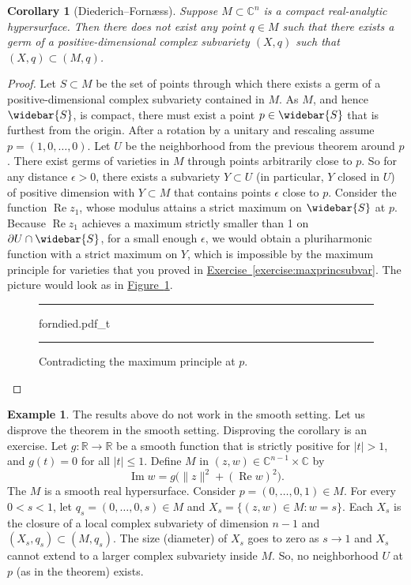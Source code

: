\documentclass[12pt,openany]{book}
\renewcommand{\Re}{\operatorname{Re}}
\renewcommand{\Im}{\operatorname{Im}}
\newcommand{\sabs}[1]{\lvert {#1} \rvert}
\newcommand{\snorm}[1]{\lVert {#1} \rVert}
\newcommand{\C}{{\mathbb{C}}}
\newcommand{\R}{{\mathbb{R}}}
\theoremstyle{plain}
\newtheorem{cor}[thm]{Corollary}
\theoremstyle{remark}
\theoremstyle{definition}
\newenvironment{myfig}{%
\begin{figure}[h!t]
\noindent\rule{\textwidth}{0.5pt}\vspace{12pt}\par\centering}%
{\par\noindent\rule{\textwidth}{0.5pt}
\end{figure}}
\theoremstyle{exercise}
\theoremstyle{example}
\newtheorem{example}[thm]{Example}
\newcommand{\figureref}[1]{\hyperref[#1]{Figure~\ref*{#1}}}
\newcommand{\exerciseref}[1]{\hyperref[#1]{Exercise~\ref*{#1}}}
\begin{document}
\begin{cor}[Diederich--Forn\ae ss]
Suppose $M \subset \C^n$ is a compact real-analytic hypersurface.
Then there does not exist any point $q \in M$ such that
there exists a germ of a positive-dimensional complex subvariety
$(X,q)$ such that $(X,q) \subset (M,q)$.
\end{cor}

\begin{proof}
Let $S \subset M$ be the set of points through which there exists 
a germ of a positive-dimensional complex subvariety contained in $M$.
As $M$, and hence $\widebar{S}$, is compact,
there must exist a point $p \in \widebar{S}$
that is furthest from
the origin.  After a rotation by a unitary and rescaling assume
$p=(1,0,\ldots,0)$.  Let $U$ be the neighborhood from the previous
theorem around $p$.  There exist germs of varieties in $M$ through points
arbitrarily close to $p$.  So for any distance $\epsilon > 0$,
there exists a subvariety $Y \subset U$ (in particular, $Y$ closed in $U$)
of positive dimension with $Y \subset M$ that contains points 
$\epsilon$ close to $p$.  Consider the function $\Re z_1$, whose modulus attains a
strict maximum on $\widebar{S}$ at $p$.  Because $\Re z_1$ achieves a maximum
strictly smaller than 1 on $\partial U \cap \widebar{S}$, for a small enough $\epsilon$,
we would obtain a pluriharmonic function with a strict
maximum on $Y$, which is impossible by the maximum principle for
varieties that you proved in \exerciseref{exercise:maxprincsubvar}.
The picture would look as in \figureref{fig:forndied}.
\begin{myfig}
\medskip
{forndied.pdf_t}
\caption{Contradicting the maximum principle at $p$.\label{fig:forndied}}
\end{myfig}
\end{proof}

\begin{example}
The results above do not work
in the smooth setting.  Let us disprove the theorem in the smooth
setting.  Disproving the corollary is an exercise.
Let $g \colon \R \to \R$ be a smooth function that is
strictly positive for $\sabs{t} > 1$, and $g(t) = 0$ for all $\sabs{t} \leq 1$.
Define $M$ in $(z,w) \in \C^{n-1} \times \C$ by
\begin{equation*}
\Im w = g\bigl(\snorm{z}^2 + (\Re w)^2\bigr) .
\end{equation*}
The $M$ is a smooth real hypersurface.
Consider $p = (0,\ldots,0,1) \in M$.  For every $0 < s < 1$, let
$q_s = (0,\ldots,0,s) \in M$ and $X_s = \bigl\{ (z,w) \in M :
w = s \bigr\}$.  Each $X_s$ is the closure of a local complex subvariety of dimension $n-1$
and $(X_s,q_s) \subset (M,q_s)$.  The size (diameter) of $X_s$ goes to
zero as $s \to 1$ and $X_s$ cannot extend to a
larger complex subvariety inside $M$.  So, no neighborhood $U$ at
$p$ (as in the theorem) exists.
\end{example}
\end{document}
